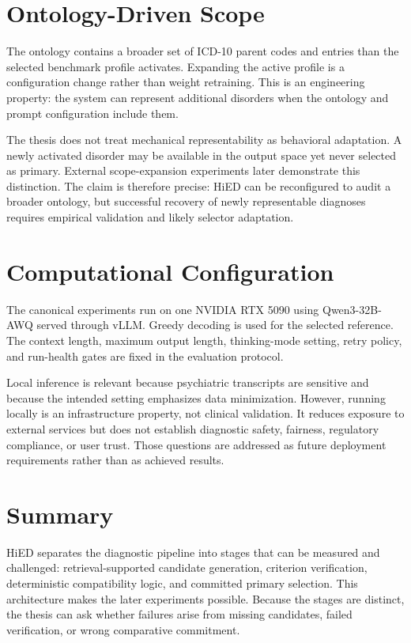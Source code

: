 \section{Ontology-Driven Scope}

The ontology contains a broader set of ICD-10 parent codes and entries than the selected benchmark profile activates. Expanding the active profile is a configuration change rather than weight retraining. This is an engineering property: the system can represent additional disorders when the ontology and prompt configuration include them.

The thesis does not treat mechanical representability as behavioral adaptation. A newly activated disorder may be available in the output space yet never selected as primary. External scope-expansion experiments later demonstrate this distinction. The claim is therefore precise: HiED can be reconfigured to audit a broader ontology, but successful recovery of newly representable diagnoses requires empirical validation and likely selector adaptation.

\section{Computational Configuration}

The canonical experiments run on one NVIDIA RTX 5090 using Qwen3-32B-AWQ served through vLLM. Greedy decoding is used for the selected reference. The context length, maximum output length, thinking-mode setting, retry policy, and run-health gates are fixed in the evaluation protocol.

Local inference is relevant because psychiatric transcripts are sensitive and because the intended setting emphasizes data minimization. However, running locally is an infrastructure property, not clinical validation. It reduces exposure to external services but does not establish diagnostic safety, fairness, regulatory compliance, or user trust. Those questions are addressed as future deployment requirements rather than as achieved results.

\section{Summary}

HiED separates the diagnostic pipeline into stages that can be measured and challenged: retrieval-supported candidate generation, criterion verification, deterministic compatibility logic, and committed primary selection. This architecture makes the later experiments possible. Because the stages are distinct, the thesis can ask whether failures arise from missing candidates, failed verification, or wrong comparative commitment.
